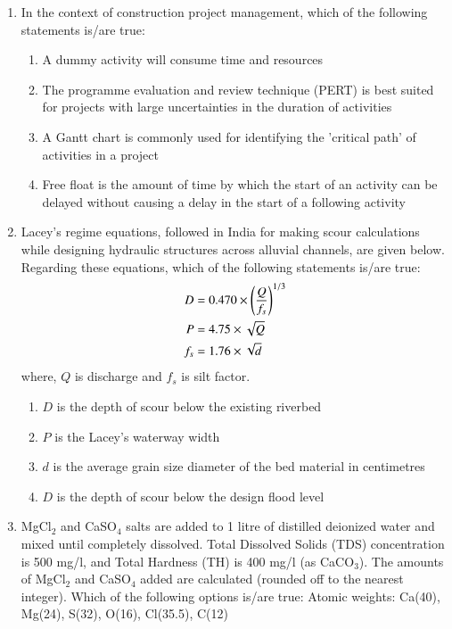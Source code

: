 \documentclass[journal,12pt,onecolumn]{article}
\theoremstyle{remark}
\begin{document}
\begin{enumerate}
\item In the context of construction project management, which of the following statements is/are true:

\hfill{}
\begin{enumerate}
    \item A dummy activity will consume time and resources
    \item The programme evaluation and review technique (PERT) is best suited for projects with large uncertainties in the duration of activities
    \item A Gantt chart is commonly used for identifying the 'critical path' of activities in a project
    \item Free float is the amount of time by which the start of an activity can be delayed without causing a delay in the start of a following activity
\end{enumerate}

\item Lacey's regime equations, followed in India for making scour calculations while designing hydraulic structures across alluvial channels, are given below. Regarding these equations, which of the following statements is/are true:
\begin{align*}
    D &= 0.470 \times \left(\frac{Q}{f_s}\right)^{1/3} \\
    P &= 4.75 \times \sqrt{Q} \\
    f_s &= 1.76 \times \sqrt{d}
\end{align*}
where, $Q$ is discharge and $f_s$ is silt factor.

\hfill{}
\begin{enumerate}
    \item $D$ is the depth of scour below the existing riverbed
    \item $P$ is the Lacey's waterway width
    \item $d$ is the average grain size diameter of the bed material in centimetres
    \item $D$ is the depth of scour below the design flood level
\end{enumerate}

\item MgCl$_2$ and CaSO$_4$ salts are added to 1 litre of distilled deionized water and mixed until completely dissolved. Total Dissolved Solids (TDS) concentration is 500 mg/l, and Total Hardness (TH) is 400 mg/l (as CaCO$_3$). The amounts of MgCl$_2$ and CaSO$_4$ added are calculated (rounded off to the nearest integer). Which of the following options is/are true:
Atomic weights: Ca(40), Mg(24), S(32), O(16), Cl(35.5), C(12)


\end{enumerate}
\end{document}
